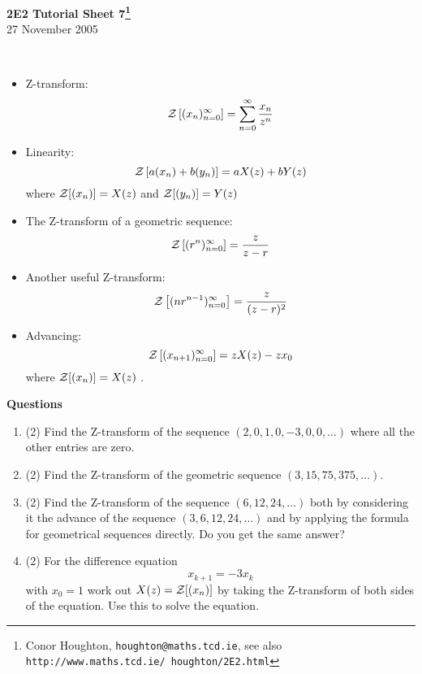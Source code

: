 \documentclass[12pt]{article}
\begin{document}
\begin{center}
{\bf 2E2 Tutorial Sheet 7\footnote{Conor Houghton, {\tt houghton@maths.tcd.ie}, see also {\tt http://www.maths.tcd.ie/ houghton/2E2.html}}}\\[1cm] 27 November 2005
\end{center}
{
\\
\begin{itemize}
\item Z-transform:
\begin{equation}
{\cal Z}\left[(x_n)_{n=0}^\infty\right]=\sum_{n=0}^\infty \frac{x_n}{z^n}
\end{equation}
\item Linearity:
\begin{equation}
{\cal Z}\left[a(x_n)+b(y_n)\right]=aX(z)+bY(z)
\end{equation}
where ${\cal Z}[(x_n)]=X(z)$ and ${\cal Z}[(y_n)]=Y(z)$
\item The Z-transform of a geometric sequence:
\begin{equation}
{\cal Z}\left[(r^n)_{n=0}^\infty\right]=\frac{z}{z-r}
\end{equation}
\item Another useful Z-transform:
\begin{equation}
{\cal Z}\left[(nr^{n-1})_{n=0}^\infty\right]=\frac{z}{(z-r)^2}
\end{equation}
\item Advancing:
\begin{equation}
{\cal Z}\left[(x_{n+1})_{n=0}^\infty\right]=zX(z)-zx_0
\end{equation}
where ${\cal Z}[(x_n)]=X(z)$ .
\end{itemize}
\vskip 1cm
{\bf Questions}
\begin{enumerate}
\item (2) Find the Z-transform of the sequence $(2,0,1,0,-3,0,0,\ldots)$ where all the other entries are zero.
\item (2) Find the Z-transform of the geometric sequence $(3,15,75,375,\ldots)$. 
\item (2) Find the Z-transform of the sequence $(6,12,24,\ldots)$ both
by considering it the advance of the sequence $(3,6,12,24,\ldots)$ and
by applying the formula for geometrical sequences directly. Do you get
the same answer?
\item (2) For the difference equation
\begin{equation}
x_{k+1}=-3x_k
\end{equation}
with $x_0=1$ work out $X(z)={\cal Z}[(x_n)]$ by taking the Z-transform of both sides of the equation. Use this to solve the equation.
\end{enumerate}
}
\end{document}
